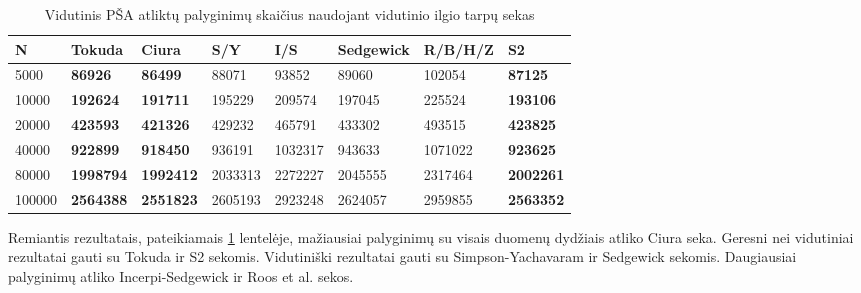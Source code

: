\documentclass{VUMIFInfKursinis}
\begin{document}
\begin{table}[H]
  \caption{Vidutinis PŠA atliktų palyginimų skaičius naudojant vidutinio ilgio tarpų sekas}
  \label{iss_medium_comparisons}
  \begin{tabular}{|l|l|l|l|l|l|l|l|}
  \hline
  N      & Tokuda           & Ciura            & S/Y     & I/S     & Sedgewick & R/B/H/Z & S2               \\ \hline
  5000   & \textbf{86926}   & \textbf{86499}   & 88071   & 93852   & 89060     & 102054  & \textbf{87125}   \\ \hline
  10000  & \textbf{192624}  & \textbf{191711}  & 195229  & 209574  & 197045    & 225524  & \textbf{193106}  \\ \hline
  20000  & \textbf{423593}  & \textbf{421326}  & 429232  & 465791  & 433302    & 493515  & \textbf{423825}  \\ \hline
  40000  & \textbf{922899}  & \textbf{918450}  & 936191  & 1032317 & 943633    & 1071022 & \textbf{923625}  \\ \hline
  80000  & \textbf{1998794} & \textbf{1992412} & 2033313 & 2272227 & 2045555   & 2317464 & \textbf{2002261} \\ \hline
  100000 & \textbf{2564388} & \textbf{2551823} & 2605193 & 2923248 & 2624057   & 2959855 & \textbf{2563352} \\ \hline
  \end{tabular}
\end{table}

Remiantis rezultatais, pateikiamais \ref{iss_medium_comparisons} lentelėje,
mažiausiai palyginimų su visais duomenų dydžiais atliko Ciura seka.
Geresni nei vidutiniai rezultatai gauti su Tokuda ir S2 sekomis.
Vidutiniški rezultatai gauti su Simpson-Yachavaram ir Sedgewick sekomis.
Daugiausiai palyginimų atliko Incerpi-Sedgewick ir Roos et al. sekos.
\end{document}
